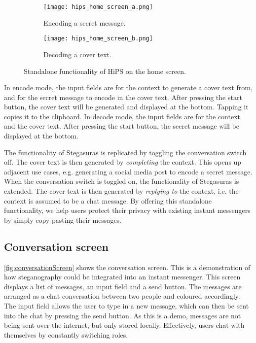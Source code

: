 \begin{figure}
    \captionsetup{width=\linewidth}
    \centering
    \begin{subfigure}{0.3\linewidth}
        \texttt{[image: hips\_home\_screen\_a.png]}
        \caption{Encoding a secret message.}
        \label{fig:homeScreenA}
    \end{subfigure}
    \hspace{1cm}
    \begin{subfigure}{0.3\linewidth}
        \texttt{[image: hips\_home\_screen\_b.png]}
        \caption{Decoding a cover text.}
        \label{fig:homeScreenB}
    \end{subfigure}
    \caption[HiPS: Home screen]{Standalone functionality of HiPS on the home screen.}
    \label{fig:homeScreen}
\end{figure}

In encode mode, the input fields are for the context to generate a cover text from, and for the secret message to encode in the cover text. After pressing the start button, the cover text will be generated and displayed at the bottom. Tapping it copies it to the clipboard. In decode mode, the input fields are for the context and the cover text. After pressing the start button, the secret message will be displayed at the bottom.

The functionality of Stegasuras is replicated by toggling the conversation switch off. The cover text is then generated by \textit{completing} the context. This opens up adjacent use cases, e.g. generating a social media post to encode a secret message. When the conversation switch is toggled on, the functionality of Stegasuras is extended. The cover text is then generated by \textit{replying to} the context, i.e. the context is assumed to be a chat message. By offering this standalone functionality, we help users protect their privacy with existing instant messengers by simply copy-pasting their messages.

\subsection{Conversation screen}
\label{sec:conversationScreen}
\cref{fig:conversationScreen} shows the conversation screen. This is a demonstration of how steganography could be integrated into an instant messenger. This screen displays a list of messages, an input field and a send button. The messages are arranged as a chat conversation between two people and coloured accordingly. The input field allows the user to type in a new message, which can then be sent into the chat by pressing the send button. As this is a demo, messages are not being sent over the internet, but only stored locally. Effectively, users chat with themselves by constantly switching roles.

